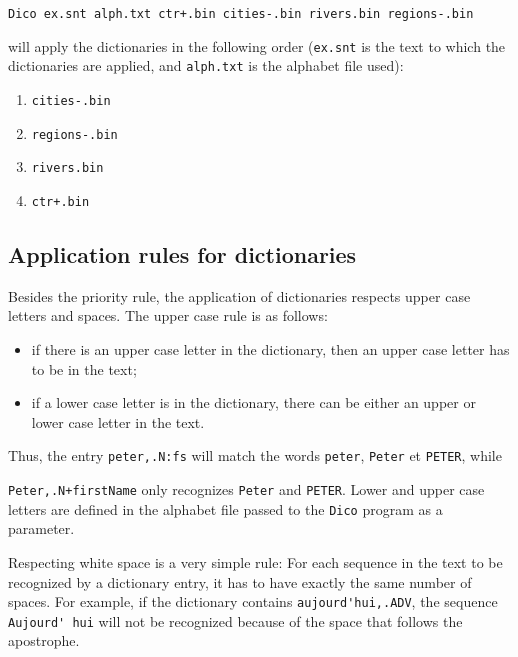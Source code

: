 \bigskip
\noindent
\verb$Dico ex.snt alph.txt ctr+.bin cities-.bin rivers.bin regions-.bin$

\bigskip \noindent will apply the dictionaries in the following order
(\verb+ex.snt+ is the text to which the dictionaries are applied, and 
\verb+alph.txt+ is the alphabet file used):

\bigskip
\begin{enumerate}
  \item \verb$cities-.bin$
  \item \verb$regions-.bin$
  \item \verb$rivers.bin$
  \item \verb$ctr+.bin$
\end{enumerate}

\subsection{Application rules for dictionaries}
\label{section-transducer-application-rules}

Besides the priority rule, the application of dictionaries respects  upper  case
letters and spaces. The upper case rule is as follows:

\begin{itemize}
  \item if there is an upper case letter in the dictionary, then an upper case
  letter has to be in the text;
  
  \item if a lower case letter is in the dictionary, there can be either an upper
  or lower case letter in the text.
\end{itemize}

\bigskip
\noindent Thus, the entry \verb$peter,.N:fs$ will match the words \verb+peter+,
\verb+Peter+ et \verb+PETER+, while

\noindent \verb$Peter,.N+firstName$ only 
recognizes \verb+Peter+ and \verb+PETER+. Lower and upper case
letters are defined in the alphabet file passed to the \verb+Dico+ program
as a parameter.

\bigskip
\noindent Respecting white space is a very simple rule: For each sequence in the text to be
recognized by a dictionary entry, it has to have exactly the same number of
spaces. For example, if the dictionary contains \verb+aujourd'hui,.ADV+, the
sequence \verb+Aujourd' hui+ will not be recognized because of the space that
follows the apostrophe.


